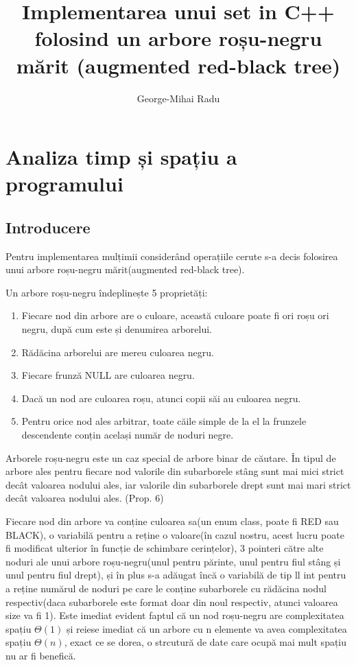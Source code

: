 \documentclass[]{report}
\title{Implementarea unui set in C++ folosind un arbore roșu-negru mărit
(augmented red-black tree)}
\author{George-Mihai Radu}
\date{}
\begin{document}
	\maketitle
	
	\chapter*{Analiza timp și spațiu a programului}

	\section*{Introducere}
	Pentru implementarea mulțimii considerând operațiile cerute s-a decis
	folosirea unui arbore roșu-negru mărit(augmented red-black tree).
	
	Un arbore roșu-negru îndeplinește 5 proprietăți: \cite{alg}
	\begin{enumerate}
	\item Fiecare nod din arbore are o culoare, această culoare poate fi ori 
		roșu ori negru, după cum este și denumirea arborelui.
	\item Rădăcina arborelui are mereu culoarea negru.
	\item Fiecare frunză NULL are culoarea negru.
	\item Dacă un nod are culoarea roșu, atunci copii săi au culoarea negru.
	\item Pentru orice nod ales arbitrar, toate căile simple de la el la frunzele
		descendente conțin același număr de noduri negre.
	\end{enumerate}

	Arborele roșu-negru este un caz special de arbore binar de căutare.
	În tipul de arbore ales pentru fiecare nod valorile din subarborele stâng
	sunt mai mici strict decât valoarea nodului ales, iar valorile din subarborele
	drept sunt mai mari strict decât valoarea nodului ales. (Prop. 6)
	
	Fiecare nod din arbore va conține culoarea sa(un enum class, poate fi RED 
	sau BLACK), o variabilă pentru a reține o valoare(în cazul nostru, acest
	lucru poate fi modificat ulterior în funcție de schimbare cerințelor), 
	3 pointeri către alte noduri ale unui arbore roșu-negru(unul pentru părinte,
	unul pentru fiul stâng și unul pentru fiul drept), și în plus s-a adăugat 
	încă o variabilă de tip ll int pentru a reține numărul de noduri pe care le
	conține subarborele cu rădăcina nodul respectiv(daca subarborele este format
	doar din noul respectiv, atunci valoarea size va fi 1). Este imediat evident
	faptul că un nod roșu-negru are complexitatea spațiu $\Theta(1)$ și reiese
	imediat că un arbore cu n elemente va avea complexitatea spațiu $\Theta(n)$,
	exact ce se dorea, o strcutură de date care ocupă mai mult spațiu nu ar fi
	benefică.
\end{document}
